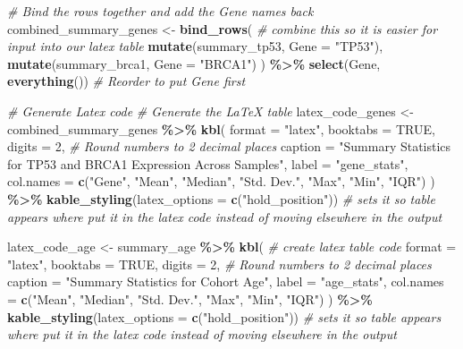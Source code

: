 \documentclass[
]{article}
\newenvironment{Shaded}{\begin{snugshade}}{\end{snugshade}}
\newcommand{\AttributeTok}[1]{\textcolor[rgb]{0.13,0.29,0.53}{#1}}
\newcommand{\CommentTok}[1]{\textcolor[rgb]{0.56,0.35,0.01}{\textit{#1}}}
\newcommand{\ConstantTok}[1]{\textcolor[rgb]{0.56,0.35,0.01}{#1}}
\newcommand{\DecValTok}[1]{\textcolor[rgb]{0.00,0.00,0.81}{#1}}
\newcommand{\FunctionTok}[1]{\textcolor[rgb]{0.13,0.29,0.53}{\textbf{#1}}}
\newcommand{\NormalTok}[1]{#1}
\newcommand{\OtherTok}[1]{\textcolor[rgb]{0.56,0.35,0.01}{#1}}
\newcommand{\SpecialCharTok}[1]{\textcolor[rgb]{0.81,0.36,0.00}{\textbf{#1}}}
\newcommand{\StringTok}[1]{\textcolor[rgb]{0.31,0.60,0.02}{#1}}
\begin{document}
\begin{Shaded}
\begin{Highlighting}[]
\CommentTok{\# Bind the rows together and add the Gene names back}
\NormalTok{combined\_summary\_genes }\OtherTok{\textless{}{-}} \FunctionTok{bind\_rows}\NormalTok{( }\CommentTok{\# combine this so it is easier for input into our latex table}
  \FunctionTok{mutate}\NormalTok{(summary\_tp53, }\AttributeTok{Gene =} \StringTok{"TP53"}\NormalTok{),}
  \FunctionTok{mutate}\NormalTok{(summary\_brca1, }\AttributeTok{Gene =} \StringTok{"BRCA1"}\NormalTok{)}
\NormalTok{) }\SpecialCharTok{\%\textgreater{}\%}
  \FunctionTok{select}\NormalTok{(Gene, }\FunctionTok{everything}\NormalTok{()) }\CommentTok{\# Reorder to put Gene first}

\CommentTok{\# Generate Latex code }
\CommentTok{\# Generate the LaTeX table}
\NormalTok{latex\_code\_genes }\OtherTok{\textless{}{-}}\NormalTok{ combined\_summary\_genes }\SpecialCharTok{\%\textgreater{}\%}
  \FunctionTok{kbl}\NormalTok{( }
    \AttributeTok{format =} \StringTok{"latex"}\NormalTok{,}
    \AttributeTok{booktabs =} \ConstantTok{TRUE}\NormalTok{,}
    \AttributeTok{digits =} \DecValTok{2}\NormalTok{, }\CommentTok{\# Round numbers to 2 decimal places}
    \AttributeTok{caption =} \StringTok{"Summary Statistics for TP53 and BRCA1 Expression Across Samples"}\NormalTok{,}
    \AttributeTok{label =} \StringTok{"gene\_stats"}\NormalTok{,}
    \AttributeTok{col.names =} \FunctionTok{c}\NormalTok{(}\StringTok{"Gene"}\NormalTok{, }\StringTok{"Mean"}\NormalTok{, }\StringTok{"Median"}\NormalTok{, }\StringTok{"Std. Dev."}\NormalTok{, }\StringTok{"Max"}\NormalTok{, }\StringTok{"Min"}\NormalTok{, }\StringTok{"IQR"}\NormalTok{)}
\NormalTok{  ) }\SpecialCharTok{\%\textgreater{}\%}
  \FunctionTok{kable\_styling}\NormalTok{(}\AttributeTok{latex\_options =} \FunctionTok{c}\NormalTok{(}\StringTok{"hold\_position"}\NormalTok{)) }\CommentTok{\# sets it so table appears where put it in the latex code instead of moving elsewhere in the output }

\NormalTok{latex\_code\_age }\OtherTok{\textless{}{-}}\NormalTok{ summary\_age }\SpecialCharTok{\%\textgreater{}\%} 
  \FunctionTok{kbl}\NormalTok{( }\CommentTok{\# create latex table code}
    \AttributeTok{format =} \StringTok{"latex"}\NormalTok{,}
    \AttributeTok{booktabs =} \ConstantTok{TRUE}\NormalTok{,}
    \AttributeTok{digits =} \DecValTok{2}\NormalTok{, }\CommentTok{\# Round numbers to 2 decimal places}
    \AttributeTok{caption =} \StringTok{"Summary Statistics for Cohort Age"}\NormalTok{,}
    \AttributeTok{label =} \StringTok{"age\_stats"}\NormalTok{,}
    \AttributeTok{col.names =} \FunctionTok{c}\NormalTok{(}\StringTok{"Mean"}\NormalTok{, }\StringTok{"Median"}\NormalTok{, }\StringTok{"Std. Dev."}\NormalTok{, }\StringTok{"Max"}\NormalTok{, }\StringTok{"Min"}\NormalTok{, }\StringTok{"IQR"}\NormalTok{)}
\NormalTok{  ) }\SpecialCharTok{\%\textgreater{}\%}
  \FunctionTok{kable\_styling}\NormalTok{(}\AttributeTok{latex\_options =} \FunctionTok{c}\NormalTok{(}\StringTok{"hold\_position"}\NormalTok{)) }\CommentTok{\# sets it so table appears where put it in the latex code instead of moving elsewhere in the output }



\end{Highlighting}
\end{Shaded}
\end{document}
